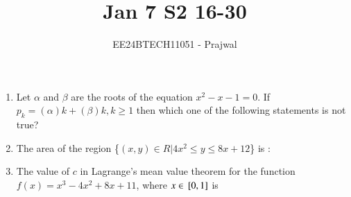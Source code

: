 \documentclass[journal,12pt,onecolumn]{IEEEtran}
\begin{document}

\vspace{3cm}

\title{Jan 7 S2 16-30}
\author{EE24BTECH11051 - Prajwal}
\maketitle

\bigskip

\renewcommand{\thefigure}{\theenumi}
\renewcommand{\thetable}{\theenumi}


\begin{enumerate}


\item Let $\alpha$ and $\beta$ are the roots of the equation $x^2-x-1=0$. If $p_k = (\alpha)k + (\beta)k, k\geq1$ then which one of the following statements is not true?
 \begin{enumerate}
\end{enumerate}


\item The area of the region \{$(x, y)\in R | 4x^2 \leq y \leq 8x + 12$\} is :
\begin{enumerate}
\end{enumerate}

\item The value of $c$ in Lagrange's mean value theorem for the function $f(x) = x^3-4x^2+8x+11$, where $x \in {}\left[0,1\right]$ is
\begin{enumerate}
\end{enumerate}


\end{enumerate}
\end{document}
